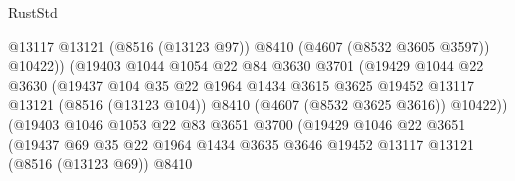 \begin{lexlean}{RustStd}
\begin{coremodule}
                                      @13117
                                      @13121
                                      (@8516 (@13123 @97))
                                      @8410
                                      (@4607 (@8532 @3605 @3597))
                                      @10422))
                                  (@19403
                                    @1044
                                    @1054
                                    @22
                                    @84
                                    @3630
                                    @3701
                                    (@19429
                                      @1044
                                      @22
                                      @3630
                                      (@19437
                                        @104
                                        @35
                                        @22
                                        @1964
                                        @1434
                                        @3615
                                        @3625
                                        @19452
                                        @13117
                                        @13121
                                        (@8516 (@13123 @104))
                                        @8410
                                        (@4607 (@8532 @3625 @3616))
                                        @10422))
                                    (@19403
                                      @1046
                                      @1053
                                      @22
                                      @83
                                      @3651
                                      @3700
                                      (@19429
                                        @1046
                                        @22
                                        @3651
                                        (@19437
                                          @69
                                          @35
                                          @22
                                          @1964
                                          @1434
                                          @3635
                                          @3646
                                          @19452
                                          @13117
                                          @13121
                                          (@8516 (@13123 @69))
                                          @8410

\end{coremodule}
\end{lexlean}
